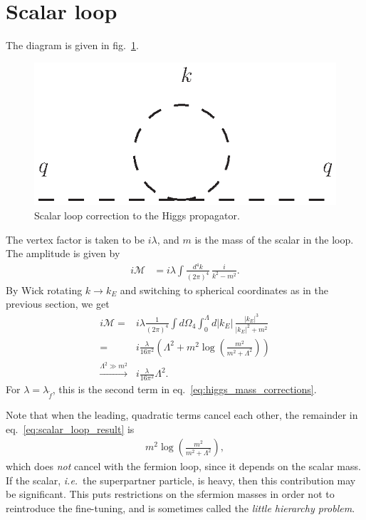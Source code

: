 \documentclass[twoside,english]{uiofysmaster}
\begin{document}
\section{Scalar loop}
The diagram is given in fig.\ \ref{fig:appendix_higgs_stop_loop}.
\begin{figure}[hbt]
\centering
\includegraphics[scale=1]{figures/appendix/higgs_stop_loop_with_momenta.eps}
\caption{Scalar loop correction to the Higgs propagator.}
\label{fig:appendix_higgs_stop_loop}
\end{figure}
The vertex factor is taken to be $i\lambda$, and $m$ is the mass of the scalar in the loop. The amplitude is given by
\begin{align}
	i\mathcal{M} &= i\lambda \int \frac{d^4k}{(2\pi)^4}\, \frac{i}{k^2-m^2}.
\end{align}
By Wick rotating $k\to k_E$ and switching to spherical coordinates as in the previous section, we get
\begin{align}
	i\mathcal{M}= &i\lambda \frac{1}{(2\pi)^4}\int d\Omega_4 \int_0^\Lambda d|k_E| \, \frac{|k_E|^3}{|k_E|^2 + m^2}\nonumber\\
				= &i\frac{\lambda}{16\pi^2} \left(\Lambda^2 + m^2\log \left( \frac{m^2}{m^2+\Lambda^2} \right) \right)\label{eq:scalar_loop_result}\\
				\overset{\Lambda^2 \gg m^2}{\to} &i\frac{\lambda}{16\pi^2} \Lambda^2.\nonumber
\end{align}
For $\lambda = \lambda_{\tilde f}$, this is the second term in eq.\ \eqref{eq:higgs_mass_corrections}. 

Note that when the leading, quadratic terms cancel each other, the remainder in eq.\ \eqref{eq:scalar_loop_result} is 
\begin{align}
	m^2\log \left( \frac{m^2}{m^2+\Lambda^2} \right),
\end{align}
which does {\it not} cancel with the fermion loop, since it depends on the scalar mass. If the scalar, {\it i.e.}\ the superpartner particle, is heavy, then this contribution may be significant. This puts restrictions on the sfermion masses in order not to reintroduce the fine-tuning, and is sometimes called the {\it little hierarchy problem}.
\end{document}
